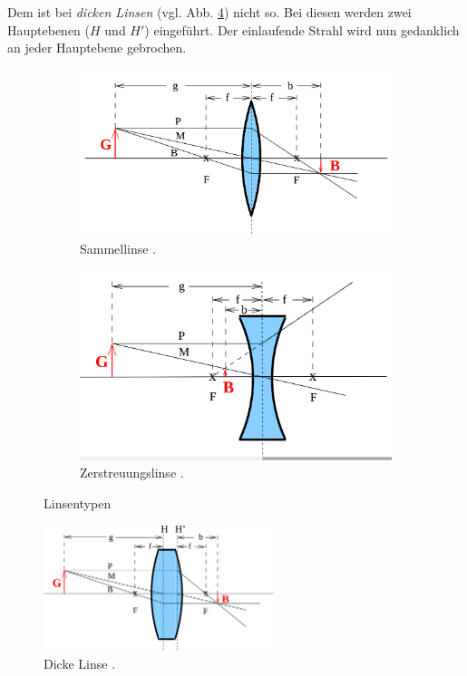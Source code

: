 Dem ist bei \emph{dicken Linsen} (vgl. Abb. \ref{fig: dicke_linse}) nicht so.
Bei diesen werden zwei Hauptebenen ($H$ und $H'$) eingeführt. Der einlaufende Strahl
wird nun gedanklich an jeder Hauptebene gebrochen.
\begin{figure}
  \centering
  \begin{subfigure}{0.48\textwidth}
    \centering
    \includegraphics[width=1 \textwidth]{./pics/sammellinse.png}
    \caption{Sammellinse \cite{anleitung408}.}
    \label{fig: sammellinse}
  \end{subfigure}
  \begin{subfigure}{0.48\textwidth}
    \centering
    \includegraphics[width=1\textwidth]{./pics/zerstreungslinse.png}
    \caption{Zerstreuungslinse \cite{anleitung408}.}
    \label{fig: zerstreungslinse}
  \end{subfigure}
  \caption{Linsentypen}
  \label{fig: linsentypen}
\end{figure}
\begin{figure}
    \centering
    \includegraphics[width=0.6\textwidth]{./pics/dicke_linse.png}
    \caption{Dicke Linse \cite{anleitung408}.}
    \label{fig: dicke_linse}
\end{figure}

